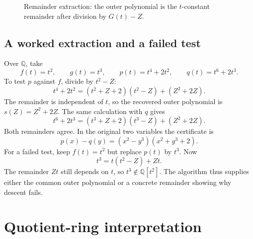 \documentclass[11pt]{article}
\theoremstyle{plain}
\theoremstyle{definition}
\theoremstyle{remark}
\begin{document}
\begin{figure}[h]
\centering
{}
\caption{Remainder extraction: the outer polynomial is the \(t\)-constant remainder after division by \(G(t)-Z\).}
\label{fig:algorithm}
\end{figure}

\subsection*{A worked extraction and a failed test}

Over \(\mathbb Q\), take
\[
f(t)=t^2,\qquad g(t)=t^3,\qquad
p(t)=t^4+2t^2,\qquad q(t)=t^6+2t^3.
\]
To test \(p\) against \(f\), divide by \(t^2-Z\):
\[
t^4+2t^2=(t^2+Z+2)(t^2-Z)+(Z^2+2Z).
\]
The remainder is independent of \(t\), so the recovered outer polynomial is
\(s(Z)=Z^2+2Z\). The same calculation with \(q\) gives
\[
t^6+2t^3=(t^3+Z+2)(t^3-Z)+(Z^2+2Z).
\]
Both remainders agree. In the original two variables the certificate is
\[
p(x)-q(y)=(x^2-y^3)(x^2+y^3+2).
\]
For a failed test, keep \(f(t)=t^2\) but replace \(p(t)\) by \(t^3\). Now
\[
t^3=t(t^2-Z)+Zt.
\]
The remainder \(Zt\) still depends on \(t\), so \(t^3\notin\mathbb Q[t^2]\).
The algorithm thus supplies either the common outer polynomial or a concrete
remainder showing why descent fails.

\section{Quotient-ring interpretation}
\end{document}
